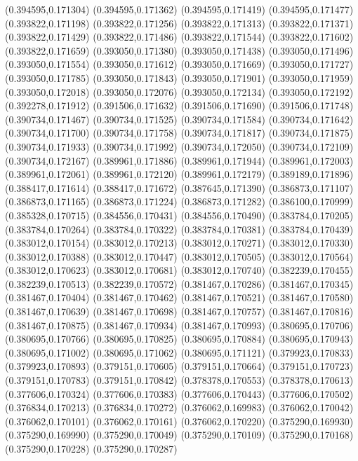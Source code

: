 (0.394595,0.171304)
(0.394595,0.171362)
(0.394595,0.171419)
(0.394595,0.171477)
(0.393822,0.171198)
(0.393822,0.171256)
(0.393822,0.171313)
(0.393822,0.171371)
(0.393822,0.171429)
(0.393822,0.171486)
(0.393822,0.171544)
(0.393822,0.171602)
(0.393822,0.171659)
(0.393050,0.171380)
(0.393050,0.171438)
(0.393050,0.171496)
(0.393050,0.171554)
(0.393050,0.171612)
(0.393050,0.171669)
(0.393050,0.171727)
(0.393050,0.171785)
(0.393050,0.171843)
(0.393050,0.171901)
(0.393050,0.171959)
(0.393050,0.172018)
(0.393050,0.172076)
(0.393050,0.172134)
(0.393050,0.172192)
(0.392278,0.171912)
(0.391506,0.171632)
(0.391506,0.171690)
(0.391506,0.171748)
(0.390734,0.171467)
(0.390734,0.171525)
(0.390734,0.171584)
(0.390734,0.171642)
(0.390734,0.171700)
(0.390734,0.171758)
(0.390734,0.171817)
(0.390734,0.171875)
(0.390734,0.171933)
(0.390734,0.171992)
(0.390734,0.172050)
(0.390734,0.172109)
(0.390734,0.172167)
(0.389961,0.171886)
(0.389961,0.171944)
(0.389961,0.172003)
(0.389961,0.172061)
(0.389961,0.172120)
(0.389961,0.172179)
(0.389189,0.171896)
(0.388417,0.171614)
(0.388417,0.171672)
(0.387645,0.171390)
(0.386873,0.171107)
(0.386873,0.171165)
(0.386873,0.171224)
(0.386873,0.171282)
(0.386100,0.170999)
(0.385328,0.170715)
(0.384556,0.170431)
(0.384556,0.170490)
(0.383784,0.170205)
(0.383784,0.170264)
(0.383784,0.170322)
(0.383784,0.170381)
(0.383784,0.170439)
(0.383012,0.170154)
(0.383012,0.170213)
(0.383012,0.170271)
(0.383012,0.170330)
(0.383012,0.170388)
(0.383012,0.170447)
(0.383012,0.170505)
(0.383012,0.170564)
(0.383012,0.170623)
(0.383012,0.170681)
(0.383012,0.170740)
(0.382239,0.170455)
(0.382239,0.170513)
(0.382239,0.170572)
(0.381467,0.170286)
(0.381467,0.170345)
(0.381467,0.170404)
(0.381467,0.170462)
(0.381467,0.170521)
(0.381467,0.170580)
(0.381467,0.170639)
(0.381467,0.170698)
(0.381467,0.170757)
(0.381467,0.170816)
(0.381467,0.170875)
(0.381467,0.170934)
(0.381467,0.170993)
(0.380695,0.170706)
(0.380695,0.170766)
(0.380695,0.170825)
(0.380695,0.170884)
(0.380695,0.170943)
(0.380695,0.171002)
(0.380695,0.171062)
(0.380695,0.171121)
(0.379923,0.170833)
(0.379923,0.170893)
(0.379151,0.170605)
(0.379151,0.170664)
(0.379151,0.170723)
(0.379151,0.170783)
(0.379151,0.170842)
(0.378378,0.170553)
(0.378378,0.170613)
(0.377606,0.170324)
(0.377606,0.170383)
(0.377606,0.170443)
(0.377606,0.170502)
(0.376834,0.170213)
(0.376834,0.170272)
(0.376062,0.169983)
(0.376062,0.170042)
(0.376062,0.170101)
(0.376062,0.170161)
(0.376062,0.170220)
(0.375290,0.169930)
(0.375290,0.169990)
(0.375290,0.170049)
(0.375290,0.170109)
(0.375290,0.170168)
(0.375290,0.170228)
(0.375290,0.170287)
